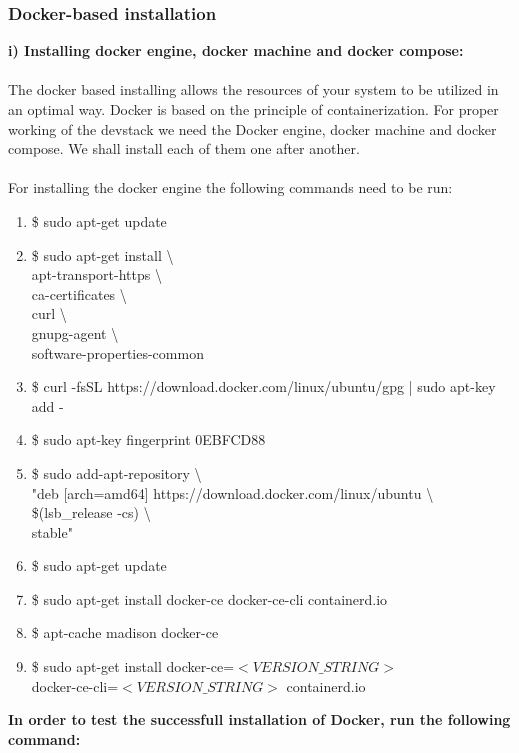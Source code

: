 \documentclass[12pt]{article}
\begin{document}
\subsubsection{Docker-based installation}
	\label{sec:dockerinstall}
	\textbf{i) Installing docker engine, docker machine and docker compose:}
	\\ \\
	The docker based installing allows the resources of your system to be utilized in an optimal way. Docker is based on the principle of containerization. For proper working of the devstack we need the Docker engine, docker machine and docker compose. We shall install each of them one after another.\\ \\
	For installing the docker engine the following commands need to be run:
	\begin{enumerate}
		\item \$ sudo apt-get update
		\item \$ sudo apt-get install \textbackslash \\
		apt-transport-https \textbackslash \\
		ca-certificates \textbackslash \\
		curl \textbackslash \\
		gnupg-agent \textbackslash \\
		software-properties-common
		\item \$ curl -fsSL https://download.docker.com/linux/ubuntu/gpg | sudo apt-key add -
		\item \$ sudo apt-key fingerprint 0EBFCD88
		\item \$ sudo add-apt-repository \textbackslash \\
		"deb [arch=amd64] https://download.docker.com/linux/ubuntu \textbackslash \\
		\$(lsb\_release -cs) \textbackslash \\
		stable"
		\item \$ sudo apt-get update
		\item \$ sudo apt-get install docker-ce docker-ce-cli containerd.io
		\item \$ apt-cache madison docker-ce
		\item \$ sudo apt-get install docker-ce=$<VERSION\_STRING>$\\docker-ce-cli=$<VERSION\_STRING>$ containerd.io
	\end{enumerate}
	\textbf{In order to test the successfull installation of Docker, run the following \\command:\\}
\end{document}
